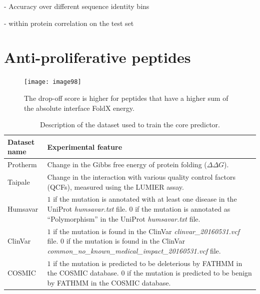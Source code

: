 
 \label{chap:results}

- Accuracy over different sequence identity bins

- within protein correlation on the test set


\section{Anti-proliferative peptides}

\begin{figure}[H]
	\centering
	\texttt{[image: image98]}
	\caption[pipeline]{The drop-off score is higher for peptides that have a higher sum of the absolute interface FoldX energy.}
\end{figure}




\begin{table}[ht]
\caption{Description of the dataset used to train the core predictor.} \label{tab:core_datasets}
\begin{tabular}{l | p{13cm}}
	\toprule
	Dataset name & Experimental feature \\
	\midrule
	Protherm \cite{kumar_protherm_2006} & Change in the Gibbs free energy of protein folding ($\Delta \Delta G$). \\
	Taipale \cite{sahni_widespread_2015} & Change in the interaction with various quality control factors (QCFs), measured using the LUMIER assay. \\
	Humsavar \cite{consortium_uniprot:_2015} & $1$ if the mutation is annotated with at least one disease in the UniProt \textit{humsavar.txt} file. $0$ if the mutation is annotated as ``Polymorphism'' in the UniProt \textit{humsavar.txt} file. \\
	ClinVar \cite{landrum_clinvar:_2016} & $1$ if the mutation is found in the ClinVar \textit{clinvar\_20160531.vcf} file. $0$ if the mutation is found in the ClinVar \textit{common\_no\_known\_medical\_impact\_20160531.vcf} file. \\
	COSMIC \cite{forbes_cosmic:_2015} & $1$ if the mutation is predicted to be deleterious by FATHMM in the COSMIC database. $0$ if the mutation is predicted to be benign by FATHMM in the COSMIC database. \\
	\bottomrule
\end{tabular}
\end{table}


